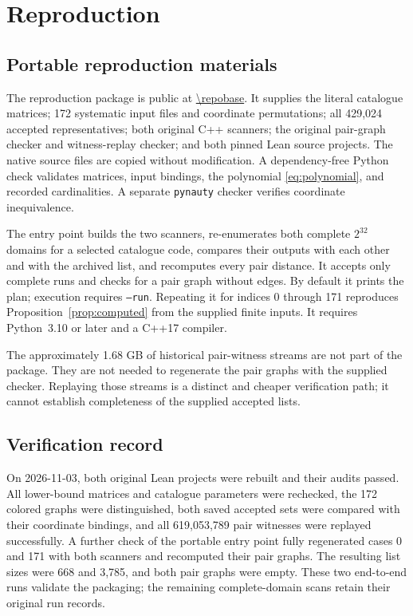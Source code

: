 \section{Reproduction}
\label{app:reproduction}
\subsection{Portable reproduction materials}
The reproduction package is public at \url{\repobase}. It supplies the literal catalogue matrices; 172 systematic input files and coordinate permutations; all 429,024 accepted representatives; both original C++ scanners; the original pair-graph checker and witness-replay checker; and both pinned Lean source projects. The native source files are copied without modification. A dependency-free Python check validates matrices, input bindings, the polynomial \eqref{eq:polynomial}, and recorded cardinalities. A separate \texttt{pynauty} checker verifies coordinate inequivalence.

The entry point  builds the two scanners, re-enumerates both complete $2^{32}$ domains for a selected catalogue code, compares their outputs with each other and with the archived list, and recomputes every pair distance. It accepts only complete runs and checks for a pair graph without edges. By default it prints the plan; execution requires \texttt{--run}. Repeating it for indices 0 through 171 reproduces Proposition~\ref{prop:computed} from the supplied finite inputs. It requires Python~3.10 or later and a C++17 compiler.

The approximately 1.68 GB of historical pair-witness streams are not part of the package. They are not needed to regenerate the pair graphs with the supplied checker. Replaying those streams is a distinct and cheaper verification path; it cannot establish completeness of the supplied accepted lists.

\subsection{Verification record}
On 2026-11-03, both original Lean projects were rebuilt and their audits passed. All lower-bound matrices and catalogue parameters were rechecked, the 172 colored graphs were distinguished, both saved accepted sets were compared with their coordinate bindings, and all 619,053,789 pair witnesses were replayed successfully. A further check of the portable entry point fully regenerated cases 0 and 171 with both scanners and recomputed their pair graphs. The resulting list sizes were 668 and 3,785, and both pair graphs were empty. These two end-to-end runs validate the packaging; the remaining complete-domain scans retain their original run records.

